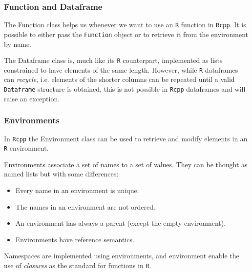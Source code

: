 \documentclass{beamer}
\def\code#1{\texttt{#1}} %
\begin{document}
\begin{frame}
\frametitle{Function and Dataframe}

The \alert{Function} class helps us whenever we want to use an \code{R} function in \code{Rcpp}. It is possible to either pass the \code{Function} object or to retrieve it from the environment by name. \pause

\bigskip

The \alert{Dataframe} class is, much like its \code{R} counterpart, implemented as lists constrained to have elements of the same length. However, while \code{R} dataframes can \emph{recycle}, i.e. elements of the shorter columns can be repeated until a valid \code{Dataframe} structure is obtained, this is not possible in \code{Rcpp} dataframes and will raise an exception.

\end{frame}


\begin{frame}
\frametitle{Environments}
In \code{Rcpp} the \alert{Environment} class can be used to retrieve and modify elements in an \code{R} environment. \pause

\bigskip

Environments associate a set of names to a set of values. They can be thought as named lists but with some differences: 
\begin{itemize}
	\item Every name in an environment is unique. \pause
	\item The names in an environment are not ordered.  \pause
	\item An environment has always a parent (except the empty environment). \pause
	\item Environments have reference semantics. \pause
\end{itemize} 

\bigskip

Namespaces are implemented using environments, and environment enable the use of \emph{closures} as the standard for functions in \code{R}. 
\end{frame}

\end{document}
